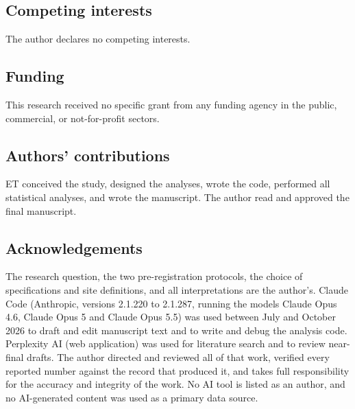 \documentclass[11pt]{article}
\begin{document}
\subsection*{Competing interests}
The author declares no competing interests.

\subsection*{Funding}
This research received no specific grant from any funding agency in the
public, commercial, or not-for-profit sectors.

\subsection*{Authors' contributions}
ET conceived the study, designed the analyses, wrote the code, performed
all statistical analyses, and wrote the manuscript.  The author read and
approved the final manuscript.

\subsection*{Acknowledgements}
The research question, the two pre-registration protocols, the choice of
specifications and site definitions, and all interpretations are the
author's.  Claude Code (Anthropic, versions 2.1.220 to 2.1.287, running
the models Claude Opus 4.6, Claude Opus 5 and Claude Opus 5.5) was used
between July and October 2026 to draft and edit manuscript text and to
write and debug the analysis code.  Perplexity AI (web application) was
used for literature search and to review near-final drafts.  The author
directed and reviewed all of that work, verified every reported number
against the record that produced it, and takes full responsibility for
the accuracy and integrity of the work.  No AI tool is listed as an
author, and no AI-generated content was used as a primary data source.



\end{document}
